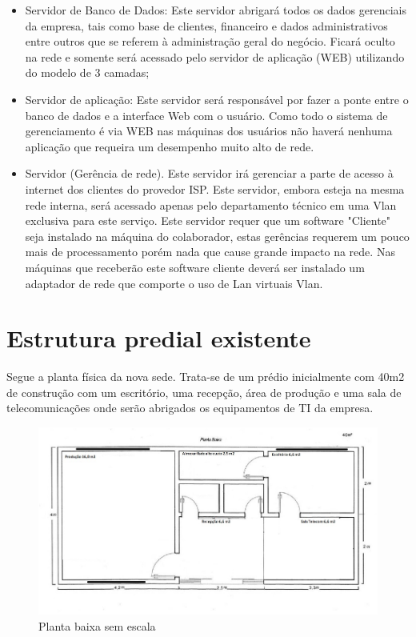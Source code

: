 \documentclass[	DIV=calc,%
							paper=a4,%
							fontsize=12pt,%
							onecolumn]{scrartcl}	 					%
\begin{document}
\begin{itemize}
\item Servidor de Banco de Dados: Este servidor abrigará todos os dados gerenciais da empresa, tais como base de clientes, financeiro e dados administrativos entre outros que se referem à administração geral do negócio. Ficará oculto na rede e somente será acessado pelo servidor de aplicação (WEB) utilizando do modelo de 3 camadas;
\item Servidor de aplicação: Este servidor será responsável por fazer a ponte entre o banco de dados e a interface Web com o usuário. Como todo o sistema de gerenciamento é via WEB nas máquinas dos usuários não haverá nenhuma aplicação que requeira um desempenho muito alto de rede.
\item Servidor (Gerência de rede). Este servidor irá gerenciar a parte de acesso à internet dos clientes do provedor ISP. Este servidor, embora esteja na mesma rede interna, será acessado apenas pelo departamento técnico em uma Vlan exclusiva para este serviço. Este servidor requer que um software "Cliente" seja instalado na máquina do colaborador, estas gerências requerem um pouco mais de processamento porém nada que cause grande impacto na rede. Nas máquinas que receberão este software cliente deverá ser instalado um adaptador de rede que comporte o uso de Lan virtuais Vlan. 

\end{itemize}


\section{Estrutura predial existente}


Segue a planta física da nova sede. Trata-se de um prédio inicialmente com 40m2 de construção com um escritório, uma recepção, área de produção e uma sala de telecomunicações onde serão abrigados os equipamentos de TI da empresa.

\begin{figure}
	\centering
	\includegraphics[width=\textwidth]{fig4}
	\caption{Planta baixa sem escala}
	\label{fig4}
\end{figure}
\end{document}
